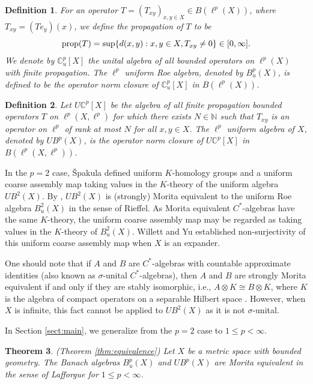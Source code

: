\documentclass[a4,11pt]{amsart}
\newtheorem{thm}{Theorem}[section]
\newtheorem{defn}[thm]{Definition}
\theoremstyle{remark}
\begin{document}
\begin{defn} 
For an operator $T=(T_{xy})_{x,y\in X}\in B(\ell^p(X))$, where $T_{xy}=(Te_y)(x)$, we define the propagation of $T$ to be
\[ \mathop{\rm prop}(T)=\sup\{ d(x,y):x,y\in X,T_{xy}\neq 0 \}\in[0,\infty]. \]
We denote by $\mathbb{C}_u^p[X]$ the unital algebra of all bounded operators on $\ell^p(X)$ with finite propagation. The $\ell^p$ uniform Roe algebra, denoted by $B^p_u(X)$, is defined to be the operator norm closure of $\mathbb{C}_u^p[X]$ in $B(\ell^p(X))$.
\end{defn}


\begin{defn}
Let $U\mathbb{C}^p[X]$ be the algebra of all finite propagation bounded operators $T$ on $\ell^p(X,\ell^p)$ for which there exists $N\in\mathbb{N}$ such that $T_{xy}$ is an operator on $\ell^p$ of rank at most $N$ for all $x,y\in X$.
The $\ell^p$ uniform algebra of $X$, denoted by $UB^p(X)$, is the operator norm closure of $U\mathbb{C}^p[X]$ in $B(\ell^p(X,\ell^p))$.
\end{defn}


In the $p=2$ case, \v{S}pakula \cite{Spa09} defined uniform $K$-homology groups and a uniform coarse assembly map taking values in the $K$-theory of the uniform algebra $UB^2(X)$. 
By \cite[Proposition 4.7]{SW13}, $UB^2(X)$ is (strongly) Morita equivalent to the uniform Roe algebra $B^2_u(X)$ in the sense of Rieffel. As Morita equivalent $C^*$-algebras have the same $K$-theory, the uniform coarse assembly map may be regarded as taking values in the $K$-theory of $B^2_u(X)$.
Willett and Yu \cite[Theorem A.3]{WY12} established non-surjectivity of this uniform coarse assembly map when $X$ is an expander.

One should note that if $A$ and $B$ are $C^*$-algebras with countable approximate identities (also known as $\sigma$-unital $C^*$-algebras), then $A$ and $B$ are strongly Morita equivalent if and only if they are stably isomorphic, i.e., $A\otimes K\cong B\otimes K$, where $K$ is the algebra of compact operators on a separable Hilbert space \cite{BGR}.
However, when $X$ is infinite, this fact cannot be applied to $UB^2(X)$ as it is not $\sigma$-unital. 

In Section \ref{sect:main}, we generalize \cite[Proposition 4.7]{SW13} from the $p=2$ case to $1\leq p<\infty$.
\begin{thm} (Theorem \ref{thm:equivalence})
Let $X$ be a metric space with bounded geometry.
The Banach algebras $B^p_u(X)$ and $UB^p(X)$ are Morita equivalent in the sense of Lafforgue for $1\leq p<\infty$.
\end{thm} 
\end{document}
